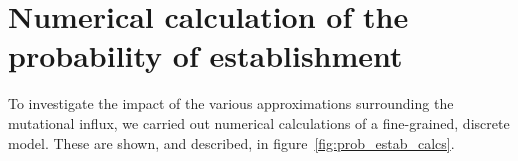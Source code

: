 \documentclass{article}
\newcommand{\gc}[1]{{\it\color{green}(#1)} }
\newcommand{\plr}[1]{{\it\color{blue}(#1)}}
\begin{document}
















\appendix

\section{Numerical calculation of the probability of establishment}
\label{apx:establishment_sims}

To investigate the impact of the various approximations surrounding the mutational influx,
we carried out numerical calculations of a fine-grained, discrete model.
These are shown, and described, in figure~\ref{fig:prob_estab_calcs}.
\end{document}

